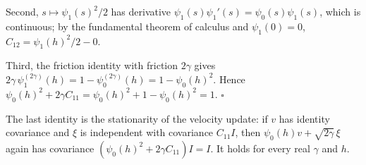 \documentclass[11pt,a4paper]{article}
\begin{document}
Second, \(s\mapsto\psi_1(s)^2/2\) has derivative \(\psi_1(s)\psi_1'(s)=\psi_0(s)\psi_1(s)\), which is continuous; by the fundamental theorem of calculus and \(\psi_1(0)=0\), \(C_{12}=\psi_1(h)^2/2-0\).




Third, the friction identity with friction \(2\gamma\) gives \(2\gamma\,\psi_1^{(2\gamma)}(h)=1-\psi_0^{(2\gamma)}(h)=1-\psi_0(h)^2\). Hence \(\psi_0(h)^2+2\gamma C_{11}=\psi_0(h)^2+1-\psi_0(h)^2=1\). \(\square\)




The last identity is the stationarity of the velocity update: if \(v\) has identity covariance and \(\xi\) is independent with covariance \(C_{11}I\), then \(\psi_0(h)v+\sqrt{2\gamma}\,\xi\) again has covariance \((\psi_0(h)^2+2\gamma C_{11})I=I\). It holds for every real \(\gamma\) and \(h\).
\end{document}
